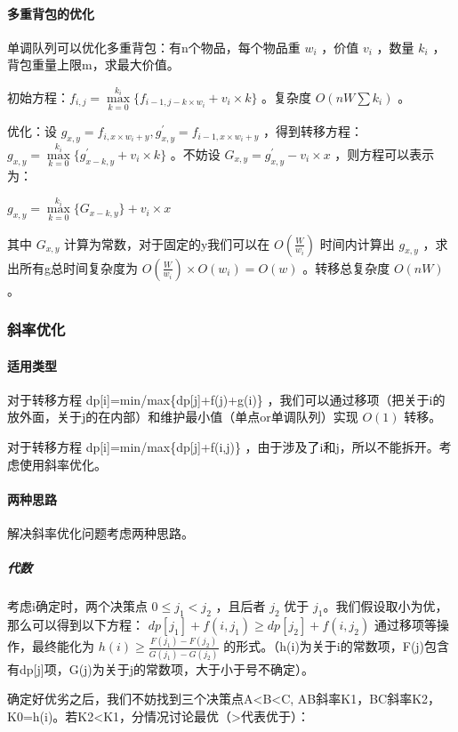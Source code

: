 \documentclass[a4paper,11pt]{article}
\begin{document}
\paragraph{多重背包的优化}
单调队列可以优化多重背包：有n个物品，每个物品重 \(w_i\) ，价值 \(v_i\) ，数量 \(k_i\) ，背包重量上限m，求最大价值。

初始方程：\(f_{i,j}=\max\limits_{k=0}^{k_i}\lbrace{f_{i-1,j-k\times w_i}+v_i\times k}\rbrace\) 。复杂度 \(O(nW\sum k_i)\) 。

优化：设 \(g_{x,y}=f_{i,x\times w_i+y},g^{'}_{x,y}=f_{i-1,x\times w_i+y}\) ，得到转移方程： 
\(g_{x,y}=\max\limits_{k=0}^{k_i}\lbrace{g^{'}_{x-k,y}+v_i\times k}\rbrace\)
。不妨设 
\(G_{x,y}=g^{'}_{x,y}-v_i\times x\)
，则方程可以表示为：

\(g_{x,y}=\max\limits_{k=0}^{k_i}\lbrace{G_{x-k,y}}\rbrace+v_i\times x\)

其中 \(G_{x,y}\) 计算为常数，对于固定的y我们可以在 \(O(\frac{W}{w_i})\) 时间内计算出 \(g_{x,y}\) ，求出所有g总时间复杂度为 \(O(\frac{W}{w_i})\times O(w_i)=O(w)\) 。转移总复杂度 \(O(nW)\) 。
\subsubsection{斜率优化}

\paragraph{适用类型}

对于转移方程 dp[i]=min/max\{dp[j]+f(j)+g(i)\} ，我们可以通过移项（把关于i的放外面，关于j的在内部）和维护最小值（单点or单调队列）实现 \(O(1)\) 转移。

对于转移方程 dp[i]=min/max\{dp[j]+f(i,j)\} ，由于涉及了i和j，所以不能拆开。考虑使用斜率优化。

\paragraph{两种思路}

解决斜率优化问题考虑两种思路。

\subparagraph{代数}
考虑i确定时，两个决策点 \(0\le j_1< j_2\) ，且后者 \(j_2\) 优于 \(j_1\)。我们假设取小为优，那么可以得到以下方程：
\(dp[j_1]+f(i,j_1)\ge dp[j_2]+f(i,j_2)\)
通过移项等操作，最终能化为
\(h(i)\ge\frac{F(j_1)-F(j_2)}{G(j_1)-G(j_2)}\)
的形式。（h(i)为关于i的常数项，F(j)包含有dp[j]项，G(j)为关于j的常数项，大于小于号不确定）。

确定好优劣之后，我们不妨找到三个决策点A<B<C, AB斜率K1，BC斜率K2，K0=h(i)。若K2<K1，分情况讨论最优（>代表优于）：
\end{document}
